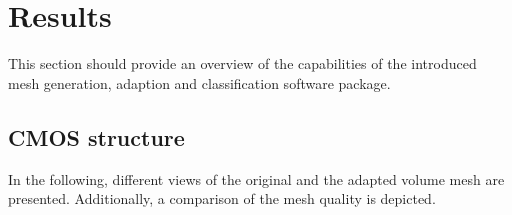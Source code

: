 \section{Results}

This section should provide an overview of the capabilities of the introduced 
mesh generation, adaption and classification software package.

\subsection{CMOS structure}

In the following, different views of the original and the adapted 
volume mesh are presented. Additionally, a comparison of the mesh quality 
is depicted.

\begin{figure}[!ht]
   \centering
   \subfloat%
   {
   }
   \subfloat%
   {
   }


\end{figure}
